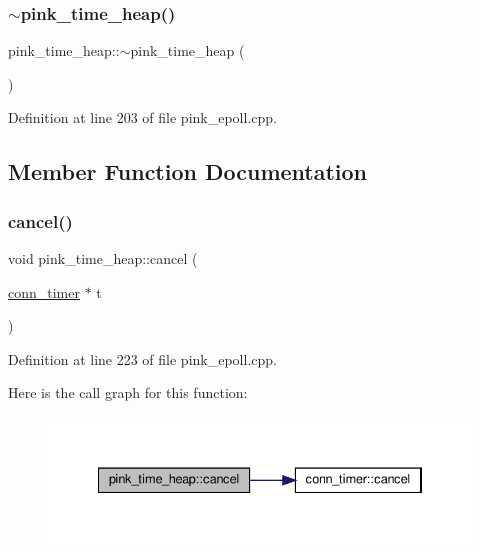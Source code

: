 \subsubsection{\texorpdfstring{$\sim$pink\+\_\+time\+\_\+heap()}{~pink\_time\_heap()}}
{\footnotesize\ttfamily pink\+\_\+time\+\_\+heap\+::$\sim$pink\+\_\+time\+\_\+heap (\begin{DoxyParamCaption}{ }\end{DoxyParamCaption})}



Definition at line 203 of file pink\+\_\+epoll.\+cpp.



\subsection{Member Function Documentation}
\mbox{\label{classpink__time__heap_a331d1f993efc7bd50f8e6d10e5f1c6ee}} 
\subsubsection{\texorpdfstring{cancel()}{cancel()}}
{\footnotesize\ttfamily void pink\+\_\+time\+\_\+heap\+::cancel (\begin{DoxyParamCaption}\item[{\hyperlink{classconn__timer}{conn\+\_\+timer} $\ast$}]{t }\end{DoxyParamCaption})}



Definition at line 223 of file pink\+\_\+epoll.\+cpp.

Here is the call graph for this function\+:\nopagebreak
\begin{figure}[H]
\begin{center}
\leavevmode
\includegraphics[width=334pt]{classpink__time__heap_a331d1f993efc7bd50f8e6d10e5f1c6ee_cgraph}
\end{center}
\end{figure}
\mbox{\label{classpink__time__heap_ade64cf32193747380cb57c5709e28383}} 

